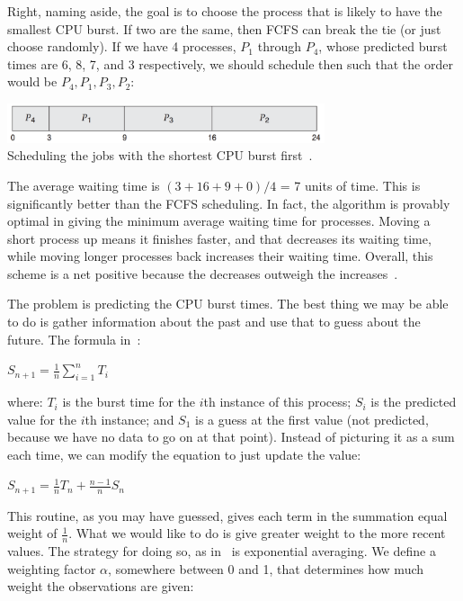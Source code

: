 Right, naming aside, the goal is to choose the process that is likely to have the smallest CPU burst. If two are the same, then FCFS can break the tie (or just choose randomly).  If we have 4 processes, $P_{1}$ through $P_{4}$, whose predicted burst times are 6, 8, 7, and 3 respectively, we should schedule then such that the order would be $P_{4}, P_{1}, P_{3}, P_{2}$:

\begin{center}
\includegraphics[width=0.7\textwidth]{images/sjf.png}\\
Scheduling the jobs with the shortest CPU burst first~\cite{osc}.
\end{center}

The average waiting time is $(3 + 16 + 9 + 0) / 4$ = 7 units of time. This is significantly better than the FCFS scheduling. In fact, the algorithm is provably optimal in giving the minimum average waiting time for processes. Moving a short process up means it finishes faster, and that decreases its waiting time, while moving longer processes back increases their waiting time. Overall, this scheme is a net positive because the decreases outweigh the increases~\cite{osc}.

The problem is predicting the CPU burst times. The best thing we may be able to do is gather information about the past and use that to guess about the future. The formula in~\cite{osi}:

\begin{center}
$S_{n+1} = \frac{1}{n}\displaystyle\sum_{i=1}^{n}T_{i}$
\end{center}

where: $T_{i}$ is the burst time for the $i$th instance of this process; $S_{i}$ is the predicted value for the $i$th instance; and $S_{1}$ is a guess at the first value (not predicted, because we have no data to go on at that point). Instead of picturing it as a sum each time, we can modify the equation to just update the value:

\begin{center}
$S_{n+1} = \frac{1}{n}T_{n} + \frac{n - 1}{n} S_{n}$
\end{center}

This routine, as you may have guessed, gives each term in the summation equal weight of $\frac{1}{n}$. What we would like to do is give greater weight to the more recent values. The strategy for doing so, as in~\cite{osi} is exponential averaging. We define a weighting factor $\alpha$, somewhere between 0 and 1, that determines how much weight the observations are given:

